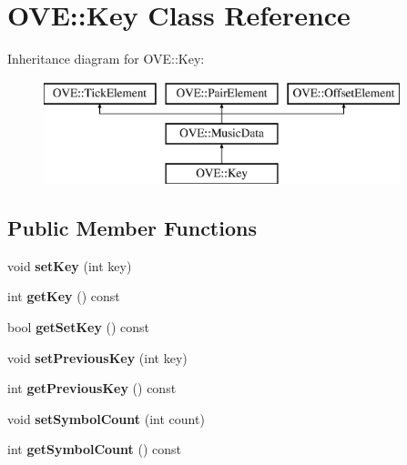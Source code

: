 \hypertarget{class_o_v_e_1_1_key}{}\section{O\+VE\+:\+:Key Class Reference}
\label{class_o_v_e_1_1_key}
Inheritance diagram for O\+VE\+:\+:Key\+:\begin{figure}[H]
\begin{center}
\leavevmode
\includegraphics[height=3.000000cm]{class_o_v_e_1_1_key}
\end{center}
\end{figure}
\subsection*{Public Member Functions}
\begin{DoxyCompactItemize}
\item 
\mbox{\label{class_o_v_e_1_1_key_a3ca26525b1eb149305975c5264df1dc6}} 
void {\bfseries set\+Key} (int key)
\item 
\mbox{\label{class_o_v_e_1_1_key_a569f677819dd380fb7cf7dd09cc7b93d}} 
int {\bfseries get\+Key} () const
\item 
\mbox{\label{class_o_v_e_1_1_key_a095e7a70f365551a3a10ea34a55df965}} 
bool {\bfseries get\+Set\+Key} () const
\item 
\mbox{\label{class_o_v_e_1_1_key_acb81d9634c85584cab9a9d9cd7fde949}} 
void {\bfseries set\+Previous\+Key} (int key)
\item 
\mbox{\label{class_o_v_e_1_1_key_af39e3d645d1028faf77ae2c427aaf4c4}} 
int {\bfseries get\+Previous\+Key} () const
\item 
\mbox{\label{class_o_v_e_1_1_key_a150b1060559f8e5de9d329ca16334619}} 
void {\bfseries set\+Symbol\+Count} (int count)
\item 
\mbox{\label{class_o_v_e_1_1_key_a81983964c45d8d1f0b1f6a82b6c82f47}} 
int {\bfseries get\+Symbol\+Count} () const
\end{DoxyCompactItemize}
